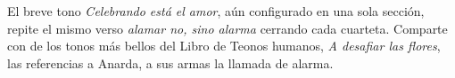 El breve tono \textit{Celebrando está el amor}, aún configurado en una sola sección, repite el mismo verso \textit{alamar no, sino alarma} cerrando cada cuarteta. 
Comparte con de los tonos más bellos del Libro de Teonos humanos, \textit{A desafiar las flores}, las referencias a Anarda, a sus armas la llamada de alarma.

